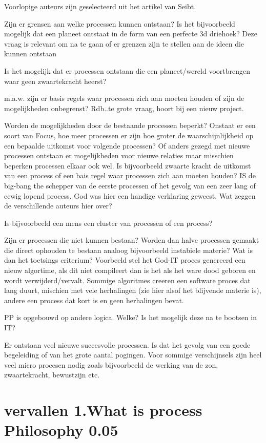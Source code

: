 \documentclass[a4paper]{Thesis}
\begin{document}
Voorlopige auteurs zijn geselecteerd uit het artikel van Seibt.

Zijn er grensen aan welke processen kunnen ontstaan? Is het bijvoorbeeld mogelijk dat een planeet ontstaat in de form van een perfecte 3d driehoek?
Deze vraag is relevant om na te gaan of er grenzen zijn te stellen aan de ideen die kunnen ontstaan

Is het mogelijk dat er processen ontstaan die een planeet/wereld voortbrengen waar geen zwaartekracht heerst?

m.a.w. zijn er basis regels waar processen zich aan moeten houden of zijn de mogelijkheden onbegrenst? 
Rdb..te grote vraag, hoort bij een nieuw project.

Worden de mogelijkheden door de bestaande processen beperkt? Onstaat er een soort van Focus, hoe meer processen er zijn hoe groter de waarschijnlijkheid op een bepaalde uitkomst voor volgende processen? Of anders gezegd met nieuwe processen ontstaan er mogelijkheden voor nieuwe relaties maar misschien beperken processen elkaar ook wel.
Is bijvoorbeeld zwaarte kracht de uitkomst van een process of een bais regel waar processen zich aan moeten houden?
IS de big-bang the schepper van de eerste processen of het gevolg van een zeer lang of eewig lopend process. God was hier een handige verklaring geweest.
Wat zeggen de verschillende auteurs hier over?

Is bijvoorbeeld een mens een cluster van processen of een process?

Zijn er processen die niet kunnen bestaan? Worden dan halve processen gemaakt die direct ophouden te bestaan analoog bijvoorbeeld instabiele materie?
Wat is dan het toetsings criterium? Voorbeeld stel het God-IT proces genereerd een nieuw algortime, als dit niet compileert dan is het als het ware dood geboren en wordt verwijderd/vervalt. Sommige algoritmes creeren een software proces dat lang duurt, mischien met vele herhalingen (zie hier alsof het blijvende materie is), andere een process dat kort is en geen herhalingen bevat.

PP is opgebouwd op andere logica. Welke? Is het mogelijk deze na te bootsen in IT?

Er ontstaan veel nieuwe succesvolle processen. Is dat het gevolg van een goede begeleiding of van het grote aantal pogingen. Voor sommige verschijnsels zijn heel veel micro procesen nodig zoals bijvoorbeeld de werking van de zon, zwaartekracht, bewustzijn etc.




\chapter{vervallen 1.What is process Philosophy 0.05}
\end{document}
